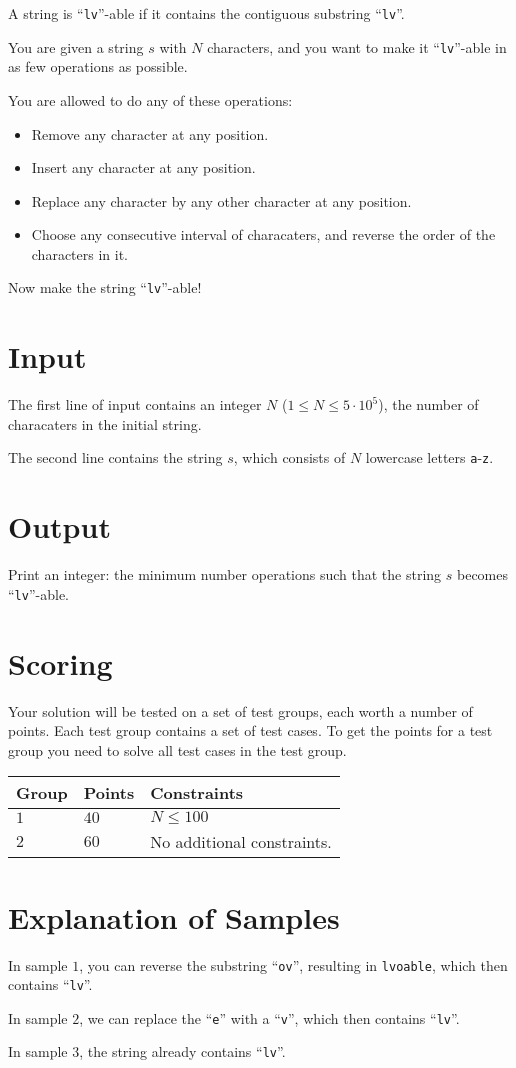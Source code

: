 \noindent
A string is ``\texttt{lv}''-able if it contains the contiguous substring ``\texttt{lv}''.

You are given a string $s$ with $N$ characters, and you want to make it ``\texttt{lv}''-able in as few operations as possible.

You are allowed to do any of these operations:
\begin{itemize}
  \item Remove any character at any position.
  \item Insert any character at any position.
  \item Replace any character by any other character at any position.
  \item Choose any consecutive interval of characaters, and reverse the order of the characters in it.
\end{itemize}

Now make the string ``\texttt{lv}''-able!

\section*{Input}
The first line of input contains an integer $N$ ($1 \leq N \leq 5 \cdot 10^5$), the number of characaters in the initial string.

The second line contains the string $s$, which consists of $N$ lowercase letters \texttt{a}-\texttt{z}.

\section*{Output}
Print an integer: the minimum number operations such that the string $s$ becomes ``\texttt{lv}''-able.

\section*{Scoring}
Your solution will be tested on a set of test groups, each worth a number of points. Each test group contains
a set of test cases. To get the points for a test group you need to solve all test cases in the test group.

\noindent
\begin{tabular}{| l | l | p{12cm} |}
  \hline
  \textbf{Group} & \textbf{Points} & \textbf{Constraints} \\ \hline
  $1$    & $40$       & $N \leq 100$ \\ \hline
  $2$    & $60$       & No additional constraints. \\ \hline
\end{tabular}

\section*{Explanation of Samples}
In sample $1$, you can reverse the substring ``\texttt{ov}'', resulting in \texttt{lvoable}, which then contains
``\texttt{lv}''.

In sample $2$, we can replace the ``\texttt{e}'' with a ``\texttt{v}'', which then contains ``\texttt{lv}''.

In sample $3$, the string already contains ``\texttt{lv}''.

